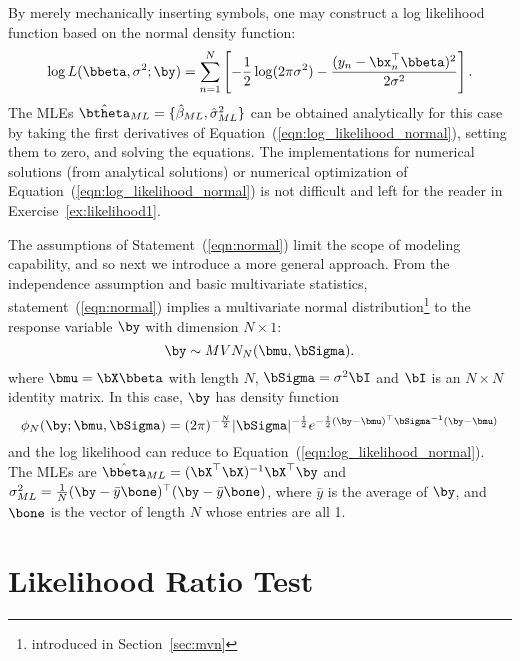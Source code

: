 By merely mechanically inserting symbols, one may construct a log likelihood 
function based on the normal density function:
\begin{equation}
\log L(\bbeta, \sigma^2; \by) = \sum_{n = 1}^N
\left[
-\frac{1}{2} \log (2\pi \sigma^2) -
\frac{(y_n - \bx_n^\top\bbeta)^2}{2\sigma^2}
\right].
\label{eqn:log_likelihood_normal}
\end{equation}
The MLEs
$\hat{\btheta}_{ML} = \{\hat{\beta}_{ML}, \hat{\sigma}^2_{ML}\}$
can be obtained analytically for this case by
taking the first derivatives of Equation~(\ref{eqn:log_likelihood_normal}),
setting them to zero, and
solving the equations.
The implementations for numerical solutions (from analytical solutions)
or numerical optimization
of Equation~(\ref{eqn:log_likelihood_normal}) is not difficult
and left for the reader in Exercise~\ref{ex:likelihood1}.

The assumptions of Statement~(\ref{eqn:normal}) limit the scope of modeling 
capability, and so next we introduce a more general approach.
From the independence assumption and basic multivariate statistics, 
statement~(\ref{eqn:normal})
implies a multivariate normal distribution\footnote{introduced in 
Section~\ref{sec:mvn}}
to the response variable $\by$ with dimension $N\times 1$:
\begin{equation}
\by \sim MVN_N(\bmu, \bSigma).
\label{eqn:mvn_n}
\end{equation}
where $\bmu = \bX\bbeta$ with length $N$,
$\bSigma = \sigma^2 \bI$ and $\bI$ is an $N\times N$ identity matrix.
In this case, $\by$ has density function
\begin{equation*}
\displaystyle
\phi_N(\by; \bmu, \bSigma) =
(2\pi)^{-\frac{N}{2}} |\bSigma|^{-\frac{1}{2}}
e^{-\frac{1}{2} (\by - \bmu)^\top \bSigma^{-1} (\by - \bmu)}
\end{equation*}
and the log likelihood can reduce to
Equation~(\ref{eqn:log_likelihood_normal}).
The MLEs are
$\hat{\bbeta}_{ML} = (\bX^\top \bX)^{-1} \bX^\top \by$ and
$\sigma^2_{ML} = \frac{1}{N} (\by - \bar{y}\bone)^\top(\by - \bar{y}\bone)$,
where $\bar{y}$ is the average of $\by$,
and $\bone$ is the vector of length $N$ whose entries are all 1.




\section{Likelihood Ratio Test}
\label{sec:lrt}

